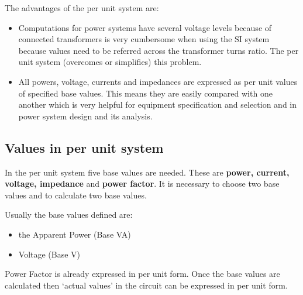 \documentclass[class=report, crop=false, 12pt,a4paper]{standalone}
\begin{document}
The advantages of the per unit system are:
\begin{itemize}
	\item Computations for power systems have several voltage levels because of connected transformers is very cumbersome when using the SI system because values need to be referred across the transformer turns ratio. The per unit system (overcomes or simplifies) this problem.
	\item All powers, voltage, currents and impedances are expressed as per unit values of specified base values. This means they are easily compared with one another which is very helpful for equipment specification and selection and in power system design and its analysis.
\end{itemize}
\subsection{Values in per unit system}
In the per unit system five base values are needed. These are \textbf{power, current, voltage, impedance} and \textbf{power factor}. It is necessary to choose two base values and to calculate two base values.

Usually the base values defined are:
\begin{itemize}
	\item the Apparent Power (Base VA)
	\item Voltage (Base V)
\end{itemize}
Power Factor is already expressed in per unit form. Once the base values are calculated then `actual values' in the circuit can be expressed in per unit form.
\end{document}
